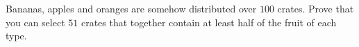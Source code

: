 Bananas, apples and oranges are somehow distributed over $100$ crates.
Prove that you can select $51$ crates that together contain at least half of the fruit of each type.
